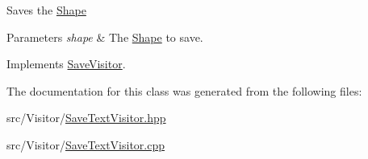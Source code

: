 Saves the \hyperlink{class_shape}{Shape} 
\begin{DoxyParams}{Parameters}
{\em shape} & The \hyperlink{class_shape}{Shape} to save. \\
\hline
\end{DoxyParams}


Implements \hyperlink{class_save_visitor_a0d6549287b18302461912fe454a08af2}{Save\+Visitor}.



The documentation for this class was generated from the following files\+:\begin{DoxyCompactItemize}
\item 
src/\+Visitor/\hyperlink{_save_text_visitor_8hpp}{Save\+Text\+Visitor.\+hpp}\item 
src/\+Visitor/\hyperlink{_save_text_visitor_8cpp}{Save\+Text\+Visitor.\+cpp}\end{DoxyCompactItemize}
